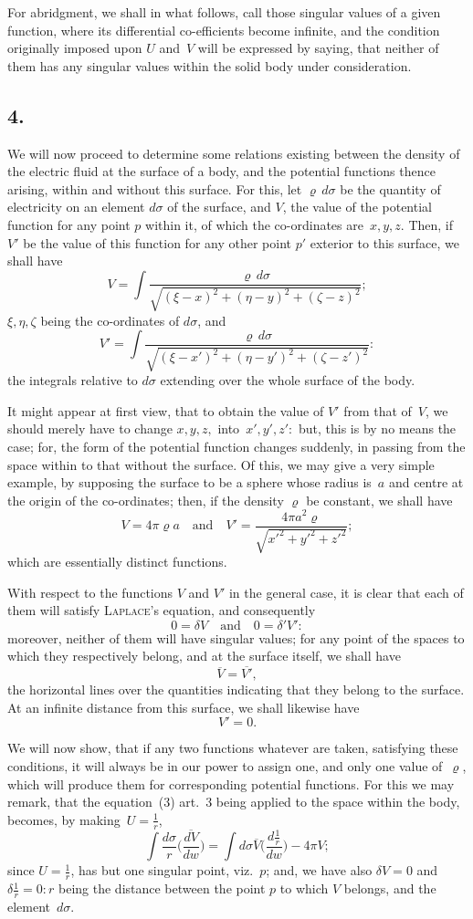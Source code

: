 \documentclass[11pt,notitlepage]{amsart}
\let\Person\textsc
\newcommand\Section[1]{\subsection{{#1}}}
\renewcommand{\rho}{\varrho}
\begin{document}
For abridgment, we shall in what follows, call those singular values
of a given function, where its differential co-efficients become infinite, and
the condition originally imposed upon $U$ and~$V$ will be expressed by saying,
that neither of them has any singular values within the solid body under
consideration.
\bigskip

\Section{4.}
We will now proceed to determine some relations existing between the
density of the electric fluid at the surface of a body,
and the potential functions
thence arising, within and without this surface. For this,
let $\rho\,d\sigma$ be the
quantity of electricity on an element $d\sigma$
of the surface, and $V$, the value of
the potential function for any point $p$ within it, of which the co-ordinates
are~$x,y,z$. Then, if $V'$ be the value
of this function for any other point $p'$
exterior to this surface, we shall have
\[
V=\int\frac{\rho\,d\sigma}
{\sqrt{(\xi-x)^2+(\eta-y)^2+(\zeta-z)^2}};
\]
$\xi,\eta,\zeta$ being the co-ordinates of $d\sigma$, and
\[
V'=\int\frac{\rho\,d\sigma}
{\sqrt{(\xi-x')^2+(\eta-y')^2+(\zeta-z')^2}}:
\]
the integrals relative to $d\sigma$
extending over the whole surface of the body.

It might appear at first view, that to obtain the value of $V'$ from that
of~$V$, we should merely have to change
$x,y,z,$ into~$x',y',z':$ but, this is
by no means the case; for, the form of
the potential function changes suddenly,
in passing from the space within to that without the surface. Of this, we may
give a very simple example, by supposing the surface to be a sphere whose
radius is~$a$ and centre at the origin of the co-ordinates;
then, if the density $\rho$
be constant, we shall have
\[
V=4\pi\rho a
\quad\text{and}\quad
V'=\frac{4\pi a^2\rho}{\sqrt{x'^2+y'^2+z'^2}};
\]
which are essentially distinct functions.

With respect to the functions $V$ and $V'$ in the general case, it is
clear that each of them will satisfy \Person{Laplace}'s
equation, and consequently
\[
0=\delta V
\quad\text{and}\quad
0=\delta' V':
\]
moreover, neither of them will have singular values; for any point of the
spaces to which they respectively belong, and at the surface itself, we shall
have
\[
\overline{V}=\overline{V'},
\]
the horizontal lines over the quantities indicating that they belong to the 
surface. At an infinite distance from this surface, we shall likewise have
\[
V'=0.
\]

We will now show, that if any two functions whatever are taken,
satisfying these conditions, it will always be in our power to assign one, and
only one value of~$\rho$, which will produce them for corresponding potential
functions. For this we may remark, that the equation~(3) art.~3 being applied
to the space within the body, becomes, by making~$U=\frac1r$,
\[
\int \frac{d\sigma}{r}\biggl(\frac{\overline{dV}}{dw}\biggr)=
\int d\sigma\overline{V}\biggl(\frac{d\frac1r}{dw}\biggr)-4\pi V;
\]
since $U=\frac1r$, has but one singular point, viz.~$p$;
and, we have also $\delta V=0$
and~$\delta\frac1r=0:r$ being the distance
between the point $p$ to which $V$ belongs,
and the element~$d\sigma$.
\end{document}
